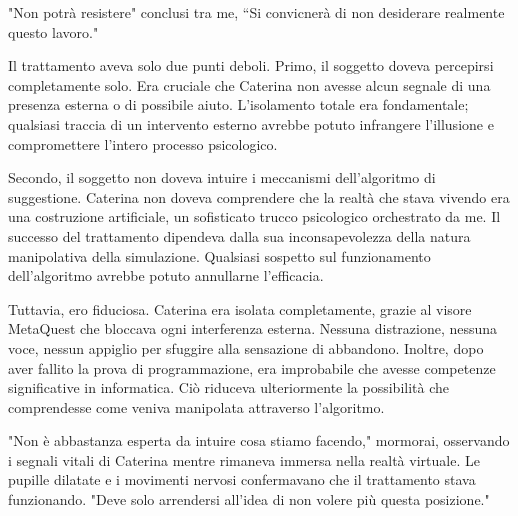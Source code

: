"Non potrà resistere" conclusi tra me,  ``Si convicnerà di non desiderare realmente questo lavoro."

Il trattamento aveva solo due punti deboli. Primo, il soggetto doveva percepirsi completamente solo. Era cruciale che Caterina non avesse alcun segnale di una presenza esterna o di possibile aiuto. L'isolamento totale era fondamentale; qualsiasi traccia di un intervento esterno avrebbe potuto infrangere l'illusione e compromettere l'intero processo psicologico.

Secondo, il soggetto non doveva intuire i meccanismi dell'algoritmo di suggestione. Caterina non doveva comprendere che la realtà che stava vivendo era una costruzione artificiale, un sofisticato trucco psicologico orchestrato da me. Il successo del trattamento dipendeva dalla sua inconsapevolezza della natura manipolativa della simulazione. Qualsiasi sospetto sul funzionamento dell'algoritmo avrebbe potuto annullarne l'efficacia.

Tuttavia, ero fiduciosa. Caterina era isolata completamente, grazie al visore MetaQuest che bloccava ogni interferenza esterna. Nessuna distrazione, nessuna voce, nessun appiglio per sfuggire alla sensazione di abbandono. Inoltre, dopo aver fallito la prova di programmazione, era improbabile che avesse competenze significative in informatica. Ciò riduceva ulteriormente la possibilità che comprendesse come veniva manipolata attraverso l'algoritmo.

"Non è abbastanza esperta da intuire cosa stiamo facendo," mormorai, osservando i segnali vitali di Caterina mentre rimaneva immersa nella realtà virtuale. Le pupille dilatate e i movimenti nervosi confermavano che il trattamento stava funzionando. "Deve solo arrendersi all'idea di non volere più questa posizione."

